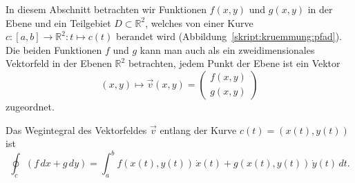 In diesem Abschnitt betrachten wir Funktionen $f(x,y)$ und $g(x,y)$
in der Ebene und ein Teilgebiet $D\subset \mathbb R^2$, welches
von einer Kurve $c\colon [a,b]\to\mathbb R^2\colon t\mapsto c(t)$
berandet wird (Abbildung~\ref{skript:kruemmung:pfad}).
Die beiden Funktionen $f$ und $g$ kann man auch als ein zweidimensionales
Vektorfeld in der Ebenen $\mathbb R^2$ betrachten, jedem Punkt der
Ebene ist ein Vektor 
\[
(x,y)\mapsto \vec{v}(x,y)=\begin{pmatrix}f(x,y)\\g(x,y)\end{pmatrix}
\]
zugeordnet.

\begin{definition}
Das Wegintegral des Vektorfeldes $\vec v$ entlang der Kurve $c(t)=(x(t),y(t))$
ist
\[
\oint_c (f\,dx + g\,dy)
= 
\int_a^b f(x(t),y(t))\, \dot x(t) + g(x(t),y(t))\, \dot y(t)\,dt.
\]
\end{definition}

